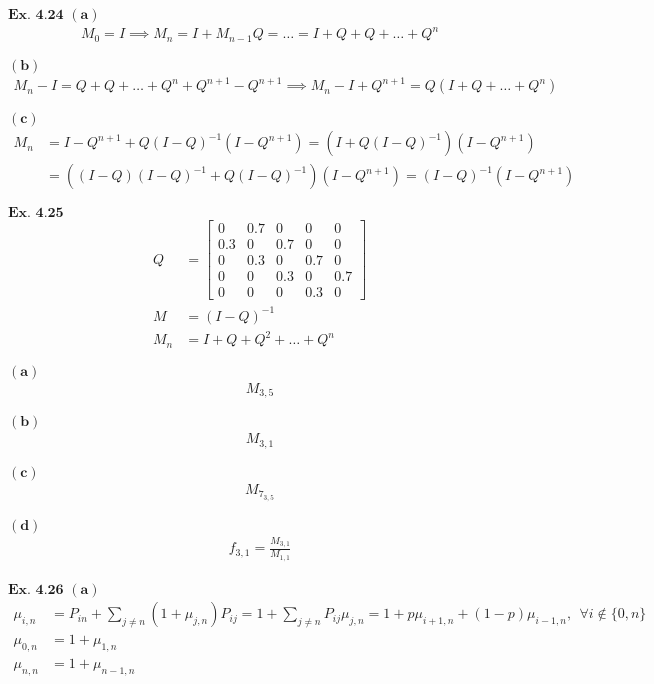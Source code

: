 \documentclass{article}
\begin{document}
\vspace{0.2in}
${\textbf{Ex. 4.24}}$
$\mathbf{(a)}$
\begin{align*}
M_0 = I \implies M_n = I + M_{n-1}Q = \ldots = I + Q + Q + \ldots + Q^n
\end{align*}

$\mathbf{(b)}$
\begin{align*}
M_n - I = Q + Q + \ldots + Q^n + Q^{n+1}-Q^{n+1} \implies M_n - I + Q^{n+1} = Q(I+Q+\ldots+Q^n)
\end{align*}

$\mathbf{(c)}$
\begin{align*}
M_n &= I-Q^{n+1} + Q(I-Q)^{-1}(I-Q^{n+1}) = (I+Q(I-Q)^{-1})(I-Q^{n+1})\\
&= ((I-Q)(I-Q)^{-1} + Q(I-Q)^{-1})(I-Q^{n+1}) = (I-Q)^{-1}(I-Q^{n+1})
\end{align*}

\vspace{0.2in}
${\textbf{Ex. 4.25}}$
\begin{align*}
Q &= \begin{bmatrix}0&0.7&0&0&0\\0.3&0&0.7&0&0\\0&0.3&0&0.7&0\\0&0&0.3&0&0.7\\0&0&0&0.3&0\end{bmatrix}\\
M &= (I-Q)^{-1}\\
M_n &= I + Q + Q^2 + \ldots + Q^n
\end{align*}

$\mathbf{(a)}$
\begin{align*}
M_{3,5}
\end{align*}

$\mathbf{(b)}$
\begin{align*}
M_{3,1}
\end{align*}

$\mathbf{(c)}$
\begin{align*}
M_{7_{3,5}}
\end{align*}

$\mathbf{(d)}$
\begin{align*}
f_{3,1} = \frac{M_{3,1}}{M_{1,1}}
\end{align*}

\vspace{0.2in}
${\textbf{Ex. 4.26}}$
$\mathbf{(a)}$
\begin{align*}
\mu_{i,n} &= P_{in} + \sum_{j\neq n}(1+\mu_{j,n})P_{ij} =  1 + \sum_{j\neq n}P_{ij}\mu_{j,n} = 1 + p\mu_{i+1,n} + (1-p)\mu_{i-1,n}, \ \ \forall i \not\in \{0,n\}\\
\mu_{0,n} &= 1 + \mu_{1,n}\\
\mu_{n,n} &= 1 + \mu_{n-1,n}
\end{align*}
\end{document}
